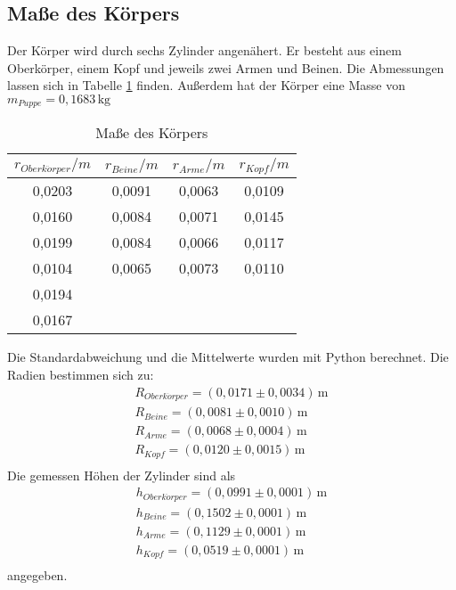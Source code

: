\subsection{Maße des Körpers}
\label{sec:maskoerper}
Der Körper wird durch sechs Zylinder angenähert. Er besteht aus einem Oberkörper, einem Kopf und jeweils zwei Armen und Beinen.
Die Abmessungen lassen sich in Tabelle \ref{tab:r_Koerper} finden. Außerdem hat der Körper eine Masse von $m_{Puppe} = 0{,}1683\,\mathrm{kg}$
\begin{table}
  \centering
  \caption{Maße des Körpers}
  \label{tab:r_Koerper}
  \begin{tabular}{c c c c}
    \toprule
    $r_{Oberk\ddot{o}rper}/m$ & $r_{Beine}/m$ & $r_{Arme}/m$ & $r_{Kopf}/m$ \\
    \midrule
    0,0203 &  0,0091 &  0,0063 & 0,0109 \\
    0,0160 &  0,0084 &  0,0071 & 0,0145 \\
    0,0199 &  0,0084 &  0,0066 & 0,0117 \\
    0,0104 &  0,0065 &  0,0073 & 0,0110 \\
    0,0194 &         &         &        \\
    0,0167 &         &         &        \\
    \bottomrule
  \end{tabular}
\end{table}
Die Standardabweichung und die Mittelwerte wurden mit Python berechnet. Die Radien bestimmen sich zu:
\begin{align*}
  R_{Oberk\ddot{o}rper}       = (0{,}0171 \pm 0{,}0034)\, \mathrm{m} \\
  R_{Beine}      = (0{,}0081 \pm 0{,}0010)\, \mathrm{m} \\
  R_{Arme}       = (0{,}0068 \pm 0{,}0004)\, \mathrm{m} \\
  R_{Kopf}       = (0{,}0120 \pm 0{,}0015)\, \mathrm{m} \\
\end{align*}
Die gemessen Höhen der Zylinder sind als
\begin{align*}
  h_{Oberk\ddot{o}rper}       = (0{,}0991 \pm 0{,}0001)\, \mathrm{m} \\
  h_{Beine}      = (0{,}1502 \pm 0{,}0001)\, \mathrm{m} \\
  h_{Arme}       = (0{,}1129 \pm 0{,}0001)\, \mathrm{m} \\
  h_{Kopf}       = (0{,}0519 \pm 0{,}0001)\, \mathrm{m} \\
\end{align*}
angegeben.

